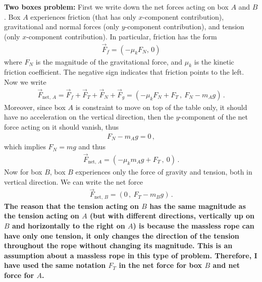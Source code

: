 \documentclass[11pt]{article}
\begin{document}
\newpage
\textbf{Two boxes problem:} First we write down the net forces acting on box $A$ and $B$. Box $A$ experiences friction (that has only $x$-component contribution), gravitational and normal forces (only $y$-component contribution), and tension (only $x$-component contribution). In particular, friction has the form
\begin{align*}
\vec{F}_f = (-\mu_k F_N, \, 0)
\end{align*}
where $F_N$ is the magnitude of the gravitational force, and $\mu_k$ is the kinetic friction coefficient. The negative sign indicates that friction points to the left. Now we write
\begin{align*}
\vec{F}_{\text{net, }A} = \vec{F}_f + \vec{F}_T + \vec{F}_N + \vec{F}_g=\left(-\mu_k F_N + F_T\,,\ F_N -m_Ag\right)\,.
\end{align*}
Moreover, since box $A$ is constraint to move on top of the table only, it should have no acceleration on the vertical direction, then the $y$-component of the net force acting on it should vanish, thus 
\begin{align*}
F_N - m_Ag = 0\,,
\end{align*}
which implies $F_N = mg$ and thus 
\begin{align*}
\vec{F}_{\text{net, }A} =\left(-\mu_k m_Ag + F_T\,,\ 0\right)\,.
\end{align*}
Now for box $B$, box $B$ experiences only the force of gravity and tension, both in vertical direction. We can write the net force 
\begin{align*}
\vec{F}_{\text{net, }B} = \left(0\,,\ F_T-m_Bg\right)\,.
\end{align*}
\textbf{The reason that the tension acting on $B$ has the same magnitude as the tension acting on $A$ (but with different directions, vertically up on $B$ and horizontally to the right on $A$) is because the massless rope can have only one tension, it only changes the direction of the tension throughout the rope without changing its magnitude. This is an assumption about a massless rope in this type of problem. Therefore, I have used the same notation $F_T$ in the net force for box $B$ and net force for $A$.} \\
\end{document}
